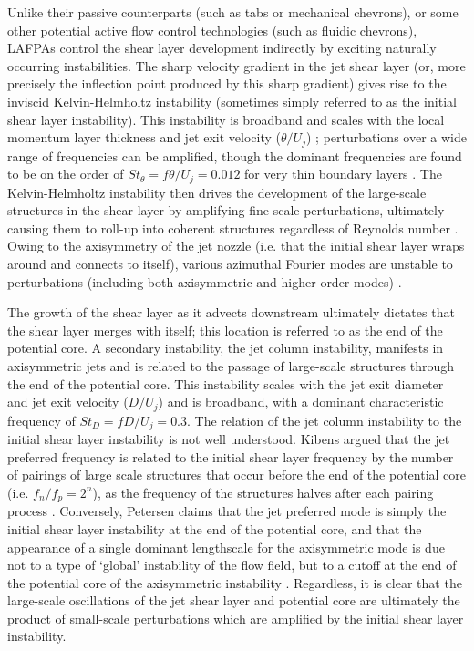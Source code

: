 Unlike their passive counterparts (such as tabs or mechanical chevrons), or some other potential active flow control technologies (such as fluidic chevrons), LAFPAs control the shear layer development indirectly by exciting naturally occurring instabilities.
The sharp velocity gradient in the jet shear layer (or, more precisely the inflection point produced by this sharp gradient) gives rise to the inviscid Kelvin-Helmholtz instability \citep{Michalke1984} (sometimes simply referred to as the initial shear layer instability).
This instability is broadband and scales with the local momentum layer thickness and jet exit velocity ($\theta / U_j$) ; perturbations over a wide range of frequencies can be amplified, though the dominant frequencies are found to be on the order of $St_{\theta} = f \theta /U_j = 0.012$ for very thin boundary layers \citep{Cohen1987}. 
The Kelvin-Helmholtz instability then drives the development of the large-scale structures in the shear layer by amplifying fine-scale perturbations, ultimately causing them to roll-up into coherent structures regardless of Reynolds number \citep{Crow1971,Brown1974}.
Owing to the axisymmetry of the jet nozzle (i.e. that the initial shear layer wraps around and connects to itself), various azimuthal Fourier modes are unstable to perturbations (including both axisymmetric and higher order modes) \citep{Cohen1987}.

The growth of the shear layer as it advects downstream ultimately dictates that the shear layer merges with itself; this location is referred to as the end of the potential core.
A secondary instability, the jet column instability, manifests in axisymmetric jets and is related to the passage of large-scale structures through the end of the potential core.
This instability scales with the jet exit diameter and jet exit velocity ($D / U_j$) and is broadband, with a dominant characteristic frequency of $St_{D} = f D /U_j = 0.3$.
The relation of the jet column instability to the initial shear layer instability is not well understood.  
Kibens argued that the jet preferred frequency is related to the initial shear layer frequency by the number of pairings of large scale structures that occur before the end of the potential core (i.e. $f_n / f_p = 2^n$), as the frequency of the structures halves after each pairing process \citep{Kibens1980}.  
Conversely, Petersen claims that the jet preferred mode is simply the initial shear layer instability at the end of the potential core, and that the appearance of a single dominant lengthscale for the axisymmetric mode is due not to a type of `global' instability of the flow field, but to a cutoff at the end of the potential core of the axisymmetric instability \citep{Petersen1988}.
Regardless, it is clear that the large-scale oscillations of the jet shear layer and potential core are ultimately the product of small-scale perturbations which are amplified by the initial shear layer instability.

